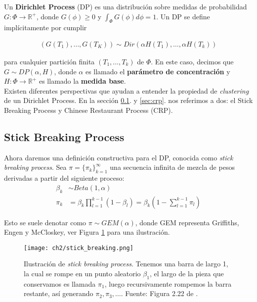 \documentclass[letterpaper,12pt,oneside]{book} %
\begin{document}
Un \textbf{Dirichlet Process} (DP) es una distribución sobre medidas de probabilidad $G: \Phi \rightarrow \mathbb{R}^{+}$, donde $G(\phi)\geq 0$ y $\int_{\Phi}G(\phi)d\phi=1$. Un DP se define implícitamente por cumplir 

\begin{align}
    (G(T_{1}), \ldots, G(T_{K})) \sim Dir(\alpha H(T_{1}), \ldots, \alpha H(T_{k}))
\end{align}

para cualquier partición finita $(T_{1}, \ldots, T_{k})$ de $\Phi$. En este caso, decimos que $G\sim DP(\alpha, H)$, donde $\alpha$ es llamado el \textbf{parámetro de concentración} y $H: \Phi \rightarrow \mathbb{R}^{+}$ es llamado la \textbf{medida base}.\\

Existen diferentes perspectivas que ayudan a entender la propiedad de \textit{clustering} de un Dirichlet Process. En la sección \ref{sec:sbp}. y \ref{sec:crp}. nos referimos a dos: el Stick Breaking Process y Chinese Restaurant Process (CRP).

\subsection{Stick Breaking Process}
\label{sec:sbp}

Ahora daremos una definición constructiva para el DP, conocida como \textit{stick breaking process}. Sea $\pi=\{\pi_{k}\}_{k=1}^{\infty}$ una secuencia infinita de mezcla de pesos derivadas a partir del siguiente proceso:
\begin{align}
    \beta_{k} & \sim Beta(1, \alpha)\\
    \pi_{k} & = \beta_{k}\prod_{l=1}^{k-1}(1-\beta_{l}) = \beta_{k}(1-\sum_{l=1}^{k-1}\pi_{l})
\end{align}

Esto se suele denotar como $\pi \sim GEM(\alpha)$, donde GEM representa Griffiths, Engen y McCloskey, ver Figura  \ref{img:stick_breaking} para una ilustración. 

\begin{figure}
    \centering
    \texttt{[image: ch2/stick\_breaking.png]}
    \caption{Ilustración de \textit{stick breaking process}. Tenemos una barra de largo 1, la cual se rompe en un punto aleatorio $\beta_{1}$, el largo de la pieza que conservamos es llamada $\pi_{1}$, luego recursivamente rompemos la barra restante, así generando $\pi_{2}, \pi_{3}, \ldots$. Fuente: Figura 2.22 de \citep{sudderth2006graphical}.}
    \label{img:stick_breaking}
\end{figure}
\end{document}
